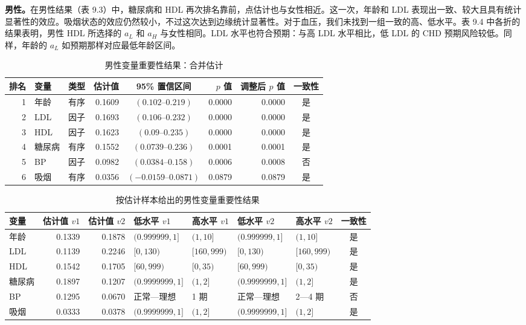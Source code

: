 \noindent\textbf{男性。}在男性结果（表 9.3）中，糖尿病和 HDL 再次排名靠前，点估计也与女性相近。这一次，年龄和 LDL 表现出一致、较大且具有统计显著性的效应。吸烟状态的效应仍然较小，不过这次达到边缘统计显著性。对于血压，我们未找到一组一致的高、低水平。表 9.4 中各折的结果表明，男性 HDL 所选择的 $a_L$ 和 $a_H$ 与女性相同。LDL 水平也符合预期：与高 LDL 水平相比，低 LDL 的 CHD 预期风险较低。同样，年龄的 $a_L$ 如预期那样对应最低年龄区间。

\begin{table}[htbp]
\centering
\caption{男性变量重要性结果：合并估计}
\label{tab:ch09-male-combined}
\begingroup
\footnotesize
\setlength{\tabcolsep}{3pt}
\begin{adjustbox}{max width=\textwidth}
\begin{tabular}{@{}rllrcrrc@{}}
\toprule
排名 & 变量 & 类型 & 估计值 & 95\% 置信区间 & $p$ 值 & 调整后 $p$ 值 & 一致性 \\
\midrule
1 & 年龄 & 有序 & 0.1609 & $(0.102\text{–}0.219)$ & 0.0000 & 0.0000 & 是 \\
2 & LDL & 因子 & 0.1693 & $(0.106\text{–}0.232)$ & 0.0000 & 0.0000 & 是 \\
3 & HDL & 因子 & 0.1623 & $(0.09\text{–}0.235)$ & 0.0000 & 0.0000 & 是 \\
4 & 糖尿病 & 有序 & 0.1552 & $(0.0739\text{–}0.236)$ & 0.0001 & 0.0001 & 是 \\
5 & BP & 因子 & 0.0982 & $(0.0384\text{–}0.158)$ & 0.0006 & 0.0008 & 否 \\
6 & 吸烟 & 有序 & 0.0356 & $(-0.0159\text{–}0.0871)$ & 0.0879 & 0.0879 & 是 \\
\bottomrule
\end{tabular}
\end{adjustbox}
\endgroup
\end{table}

\begin{table}[htbp]
\centering
\caption{按估计样本给出的男性变量重要性结果}
\label{tab:ch09-male-folds}
\begingroup
\footnotesize
\setlength{\tabcolsep}{2pt}
\begin{adjustbox}{max width=\textwidth}
\begin{tabular}{@{}lrrllllc@{}}
\toprule
变量 & 估计值 $v1$ & 估计值 $v2$ & 低水平 $v1$ & 高水平 $v1$ & 低水平 $v2$ & 高水平 $v2$ & 一致性 \\
\midrule
年龄 & 0.1339 & 0.1878 & $(0.999999,1]$ & $(1,10]$ & $(0.999999,1]$ & $(1,10]$ & 是 \\
LDL & 0.1139 & 0.2246 & $[0,130)$ & $[160,999)$ & $[0,130)$ & $[160,999)$ & 是 \\
HDL & 0.1542 & 0.1705 & $[60,999)$ & $[0,35)$ & $[60,999)$ & $[0,35)$ & 是 \\
糖尿病 & 0.1897 & 0.1207 & $(0.9999999,1]$ & $(1,2]$ & $(0.9999999,1]$ & $(1,2]$ & 是 \\
BP & 0.1295 & 0.0670 & 正常—理想 & 1 期 & 正常—理想 & 2—4 期 & 否 \\
吸烟 & 0.0333 & 0.0378 & $(0.9999999,1]$ & $(1,2]$ & $(0.9999999,1]$ & $(1,2]$ & 是 \\
\bottomrule
\end{tabular}
\end{adjustbox}
\endgroup
\end{table}
\FloatBarrier
